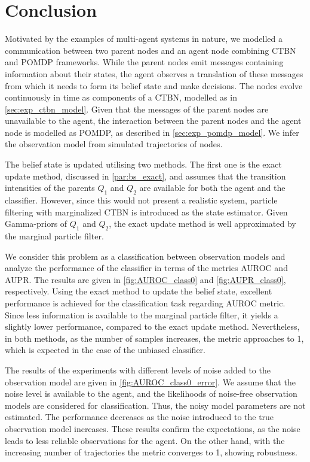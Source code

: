 \chapter{Conclusion}
\label{chap:5}
Motivated by the examples of multi-agent systems in nature, we modelled a communication between two parent nodes and an agent node combining CTBN and POMDP frameworks. While the parent nodes emit messages containing information about their states, the agent observes a translation of these messages from which it needs to form its belief state and make decisions. The nodes evolve continuously in time as components of a CTBN, modelled as in \cref{sec:exp_ctbn_model}. Given that the messages of the parent nodes are unavailable to the agent, the interaction between the parent nodes and the agent node is modelled as POMDP, as described in \cref{sec:exp_pomdp_model}. We infer the observation model from simulated trajectories of nodes. \par
The belief state is updated utilising two methods. The first one is the exact update method, discussed in \cref{par:bs_exact}, and assumes that the transition intensities of the parents $ Q_1 $ and $ Q_2 $ are available for both the agent and the classifier. However, since this would not present a realistic system, particle filtering with marginalized CTBN is introduced as the state estimator. Given Gamma-priors of $ Q_1 $ and $ Q_2 $, the exact update method is well approximated by the marginal particle filter.\par
We consider this problem as a classification between observation models and analyze the performance of the classifier in terms of the metrics AUROC and AUPR. The results are given in \autoref{fig:AUROC_class0} and \autoref{fig:AUPR_class0}, respectively. Using the exact method to update the belief state, excellent performance is achieved for the classification task regarding AUROC metric. Since less information is available to the marginal particle filter, it yields a slightly lower performance, compared to the exact update method. Nevertheless, in both methods, as the number of samples increases, the metric approaches to 1, which is expected in the case of the unbiased classifier.\par
The results of the experiments with different levels of noise added to the observation model are given in \autoref{fig:AUROC_class0_error}. We assume that the noise level is available to the agent, and the likelihoods of noise-free observation models are considered for classification. Thus, the noisy model parameters are not estimated. The performance decreases as the noise introduced to the true observation model increases. These results confirm the expectations, as the noise leads to less reliable observations for the agent. On the other hand, with the increasing number of trajectories the metric converges to 1, showing robustness.\par
